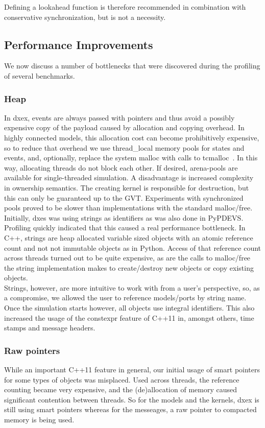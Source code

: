 Defining a lookahead function is therefore recommended in combination with conservative synchronization, but is not a necessity.

\subsection{Performance Improvements}
We now discuss a number of bottlenecks that were discovered during the profiling of several benchmarks.
\subsubsection{Heap}
In dxex, events are always passed with pointers and thus avoid a possibly expensive copy of the payload caused by allocation and copying overhead. In highly connected models, this allocation cost can become prohibitively expensive, so to reduce that overhead we use thread\_local memory pools for states and events, and, optionally, replace the system malloc with calls to tcmalloc~\cite{tcmalloc}. In this way, allocating threads do not block each other. If desired, arena-pools are available for single-threaded simulation. A disadvantage is increased complexity in ownership semantics. The creating kernel is responsible for destruction, but this can only be guaranteed up to the GVT. Experiments with synchronized pools proved to be slower than implementations with the standard malloc/free.\\
Initially, dxes was using strings as identifiers as was also done in PyPDEVS. Profiling quickly indicated that this caused a real performance bottleneck. In C++, strings are heap allocated variable sized objects with an atomic reference count and not not immutable objects as in Python. Access of that reference count across threads turned out to be quite expensive, as are the calls to malloc/free the string implementation makes to create/destroy new objects or copy existing objects.\\
Strings, however, are more intuitive to work with from a user's perspective, so, as a compromise, we allowed the user to reference models/ports by string name. Once the simulation starts however, all objects use integral identifiers. This also increased the usage of the constexpr feature of C++11 in, amongst others, time stamps and message headers.
\subsubsection{Raw pointers}
While an important C++11 feature in general, our initial usage of smart pointers for some types of objects was misplaced. Used across threads, the reference counting became very expensive, and the (de)allocation of memory caused significant contention between threads. So for the models and the kernels, dxex is still using smart pointers whereas for the messeages, a raw pointer to compacted memory is being used. 
